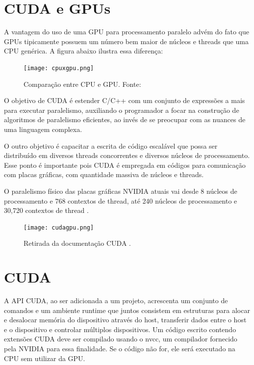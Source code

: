 \documentclass[12pt]{article}
\begin{document}
\section{CUDA e GPUs} \label{sec:primeirasecao}


A vantagem do uso de uma GPU para processamento paralelo advém do fato que GPUs tipicamente possuem um número bem maior de núcleos e threads que uma CPU genérica. A figura abaixo ilustra essa diferença:

\begin{figure}[H]
\centering
\texttt{[image: cpuxgpu.png]}
\caption{Comparação entre CPU e GPU. Fonte: \cite{nvidia} }
\label{fig:figura2}
\end{figure}

O objetivo de CUDA é estender C/C++ com um conjunto de expressões a mais para executar paralelismo, auxiliando o programador a focar na construção de algoritmos de paralelismo eficientes, ao invés de se preocupar com as nuances de uma linguagem complexa.

O outro objetivo é capacitar a escrita de código escalável que possa ser distribuído em diversos threads concorrentes e diversos núcleos de processamento. Esse ponto é importante pois CUDA é empregada em códigos para comunicação com placas gráficas, com quantidade massiva de núcleos e threads.

O paralelismo físico das placas gráficas NVIDIA atuais vai desde 8 núcleos de processamento e 768 contextos de thread, até 240 núcleos de processamento e 30,720 contextos de thread \cite{CUDAartigo1}.

\begin{figure}[H]
\centering
\texttt{[image: cudagpu.png]}
\caption{Retirada da documentação CUDA \cite{nvidia}. }
\label{fig:figura3}
\end{figure}

\section{CUDA} \label{sec:maincuda}
A API CUDA, ao ser adicionada a um projeto, acrescenta um conjunto de comandos e um ambiente runtime que juntos consistem em estruturas para alocar e desalocar memória do dispositivo através do host, transferir dados entre o host e o dispositivo e controlar múltiplos dispositivos. 
Um código escrito contendo extensões CUDA deve ser compilado usando o nvcc, um compilador fornecido pela NVIDIA para essa finalidade. Se o código não for, ele será executado na CPU sem utilizar da GPU.
\end{document}
